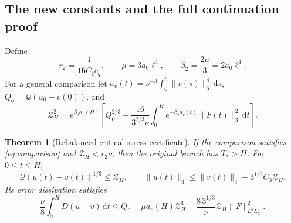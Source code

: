 \documentclass[11pt,a4paper]{article}
\newtheorem{theorem}{Theorem}[section]
\theoremstyle{definition}\newtheorem{definition}[theorem]{Definition}
\theoremstyle{remark}\newtheorem{remark}[theorem]{Remark}
\newcommand{\Q}{\mathcal Q}
\newcommand{\dd}{\,\mathrm d}
\newcommand{\norm}[1]{\lVert #1\rVert}
\newcommand{\Zcert}{\mathscr Z}
\newcommand{\CS}{C_\sharp}
\numberwithin{equation}{section}
\begin{document}
\subsection{The new constants and the full continuation proof}
Define
\begin{equation}\label{eq:newconstants}
 r_2=\frac1{16\CS c_q},\qquad
 \mu=3a_0\ell^4,\qquad \beta_2=\frac{2\mu}{3}=2a_0\ell^4.
\end{equation}
For a general comparison let $a_v(t)=\nu^{-3}\int_0^t\norm{v(s)}_6^4\dd s$, $Q_0=\Q(u_0-v(0))$, and
\begin{equation}\label{eq:newcertificate}
 \Zcert_H^2=e^{\beta_2a_v(H)}\left[
 Q_0^{2/3}+\frac{16}{3^{2/3}\nu}
 \int_0^H e^{-\beta_2a_v(t)}\norm{F(t)}_3^2\dd t\right].
\end{equation}

\begin{theorem}[Rebalanced critical stress certificate]\label{thm:certificate}
If the comparison satisfies \eqref{eq:comparison} and $\Zcert_H<r_2\nu$, then the original branch has $T_*>H$. For $0\le t\le H$,
\begin{equation}\label{eq:Qcertbound}
 \Q(u(t)-v(t))^{1/3}\le\Zcert_H,
 \qquad\norm{u(t)}_3\le\norm{v(t)}_3+3^{1/3}C_3\Zcert_H.
\end{equation}
Its error dissipation satisfies
\begin{equation}\label{eq:certD}
 \frac\nu8\int_0^H D(u-v)\dd t
 \le Q_0+\mu a_v(H)\Zcert_H^3
       +\frac{8\,3^{1/3}}\nu\Zcert_H\norm F_{L^2_tL^3_x}^2.
\end{equation}
\end{theorem}
\end{document}

